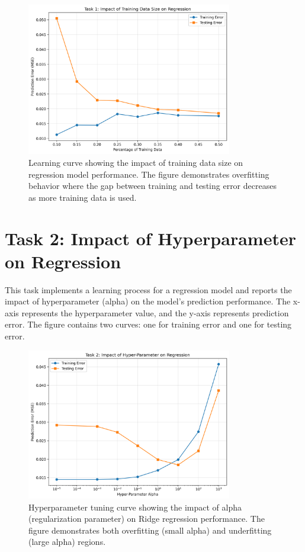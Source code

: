 \documentclass[letterpaper,11pt,twoside]{article}
\begin{document}
\begin{figure}[h]
    \centering
    \includegraphics[width=0.8\textwidth]{../Figures/Figure1.png}
    \caption{Learning curve showing the impact of training data size on regression model performance. The figure demonstrates overfitting behavior where the gap between training and testing error decreases as more training data is used.}
    \label{fig:task1}
\end{figure}

\newpage

\section{Task 2: Impact of Hyperparameter on Regression}

This task implements a learning process for a regression model and reports the impact of hyperparameter (alpha) on the model's prediction performance. The x-axis represents the hyperparameter value, and the y-axis represents prediction error. The figure contains two curves: one for training error and one for testing error.

\begin{figure}[h]
    \centering
    \includegraphics[width=0.8\textwidth]{../Figures/Figure2.png}
    \caption{Hyperparameter tuning curve showing the impact of alpha (regularization parameter) on Ridge regression performance. The figure demonstrates both overfitting (small alpha) and underfitting (large alpha) regions.}
    \label{fig:task2}
\end{figure}
\end{document}
